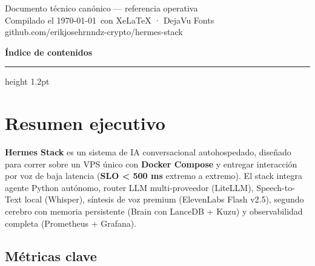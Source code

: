 \documentclass[11pt,a4paper]{article}
\begin{document}
\vspace{2cm}
\begin{center}
{\small\sffamily\color{hermesgray}
Documento técnico canónico — referencia operativa\\
Compilado el \today\ con XeLaTeX · DejaVu Fonts}\\[6pt]
{\footnotesize\sffamily\color{hermesgray}
github.com/erikjosehrnndz-crypto/hermes-stack}
\end{center}

\newpage

\thispagestyle{fancy}
{\color{hermesblue}\sffamily\Large\bfseries Índice de contenidos}\\[4pt]
{\color{hermescyan}\hrule height 1.2pt}
\vspace{12pt}
\setcounter{tocdepth}{2}
\renewcommand{\contentsname}{}
\tableofcontents

\newpage

\section{Resumen ejecutivo}

\textbf{Hermes Stack} es un sistema de IA conversacional autohospedado, diseñado para correr sobre un VPS único con \textbf{Docker Compose} y entregar interacción por voz de baja latencia (\textbf{SLO < 500 ms} extremo a extremo). El stack integra agente Python autónomo, router LLM multi-proveedor (LiteLLM), Speech-to-Text local (Whisper), síntesis de voz premium (ElevenLabs Flash v2.5), segundo cerebro con memoria persistente (Brain con LanceDB + Kuzu) y observabilidad completa (Prometheus + Grafana).

\subsection{Métricas clave}
\end{document}
